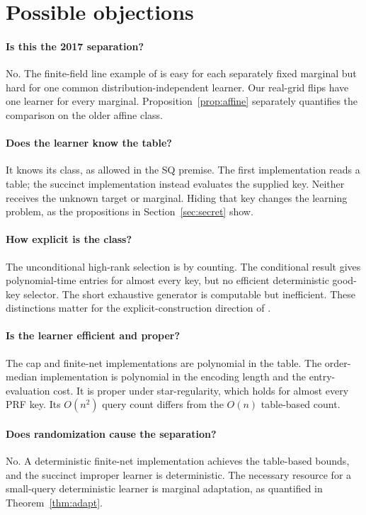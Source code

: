 \section{Possible objections}\label{sec:objections}
\paragraph{Is this the 2017 separation?}
No. The finite-field line example of \citet{Feldman17} is easy for each separately fixed marginal but hard for one common distribution-independent learner. Our real-grid flips have one learner for every marginal. Proposition~\ref{prop:affine} separately quantifies the comparison on the older affine class.

\paragraph{Does the learner know the table?}
It knows its class, as allowed in the SQ premise. The first implementation reads a table; the succinct implementation instead evaluates the supplied key. Neither receives the unknown target or marginal. Hiding that key changes the learning problem, as the propositions in Section~\ref{sec:secret} show.

\paragraph{How explicit is the class?}
The unconditional high-rank selection is by counting. The conditional result gives polynomial-time entries for almost every key, but no efficient deterministic good-key selector. The short exhaustive generator is computable but inefficient. These distinctions matter for the explicit-construction direction of \citet[Problem~4.1]{HHPTZ22}.

\paragraph{Is the learner efficient and proper?}
The cap and finite-net implementations are polynomial in the table. The order-median implementation is polynomial in the encoding length and the entry-evaluation cost. It is proper under star-regularity, which holds for almost every PRF key. Its $O(n^2)$ query count differs from the $O(n)$ table-based count.

\paragraph{Does randomization cause the separation?}
No. A deterministic finite-net implementation achieves the table-based bounds, and the succinct improper learner is deterministic. The necessary resource for a small-query deterministic learner is marginal adaptation, as quantified in Theorem~\ref{thm:adapt}.
